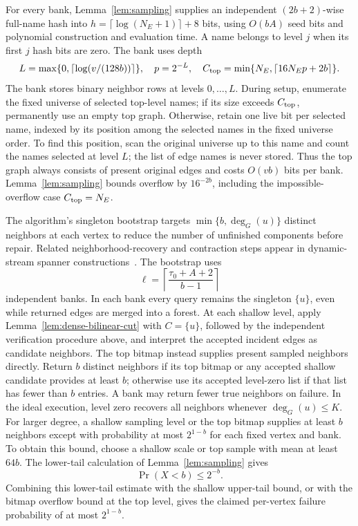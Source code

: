 \documentclass[11pt,letterpaper]{article}
\numberwithin{equation}{section}
\begin{document}
For every bank, Lemma~\ref{lem:sampling} supplies an independent $(2b+2)$-wise full-name hash into $h=\lceil\log(N_E+1)\rceil+8$ bits, using $O(bA)$ seed bits and polynomial construction and evaluation time.
A name belongs to level $j$ when its first $j$ hash bits are zero.
The bank uses depth
\begin{equation}
L=\max\{0,\lceil\log(v/(128b))\rceil\},\quad
 p=2^{-L},\quad
 C_{\rm top}=\min\{N_E,\lceil16N_Ep+2b\rceil\}.
                                                               \label{eq:forest-df13}
\end{equation}
The bank stores binary neighbor rows at levels $0,\ldots,L$.
During setup, enumerate the fixed universe of selected top-level names; if its size exceeds $C_{\rm top}$, permanently use an empty top graph.
Otherwise, retain one live bit per selected name, indexed by its position among the selected names in the fixed universe order.
To find this position, scan the original universe up to this name and count the names selected at level $L$; the list of edge names is never stored.
Thus the top graph always consists of present original edges and costs $O(vb)$ bits per bank.
Lemma~\ref{lem:sampling} bounds overflow by $16^{-2b}$, including the impossible-overflow case $C_{\rm top}=N_E$.

The algorithm's singleton bootstrap targets $\min\{b,\deg_G(u)\}$ distinct neighbors at each vertex to reduce the number of unfinished components before repair.
Related neighborhood-recovery and contraction steps appear in dynamic-stream spanner constructions~\cite{KapralovWoodruff2014}.
The bootstrap uses
\begin{equation}
\ell=\left\lceil\frac{\tau_0+A+2}{b-1}\right\rceil
                                                               \label{eq:forest-df14}
\end{equation}
independent banks.
In each bank every query remains the singleton $\{u\}$, even while returned edges are merged into a forest.
At each shallow level, apply Lemma~\ref{lem:dense-bilinear-cut} with $C=\{u\}$, followed by the independent verification procedure above, and interpret the accepted incident edges as candidate neighbors.
The top bitmap instead supplies present sampled neighbors directly.
Return $b$ distinct neighbors if its top bitmap or any accepted shallow candidate provides at least $b$; otherwise use its accepted level-zero list if that list has fewer than $b$ entries.
A bank may return fewer true neighbors on failure.
In the ideal execution, level zero recovers all neighbors whenever $\deg_G(u)\le K$.
For larger degree, a shallow sampling level or the top bitmap supplies at least $b$ neighbors except with probability at most $2^{1-b}$ for each fixed vertex and bank.
To obtain this bound, choose a shallow scale or top sample with mean at least $64b$.
The lower-tail calculation of Lemma~\ref{lem:sampling} gives
\begin{equation}
\Pr(X<b)\le2^{-b}.
                                                               \label{eq:forest-df15}
\end{equation}
Combining this lower-tail estimate with the shallow upper-tail bound, or with the bitmap overflow bound at the top level, gives the claimed per-vertex failure probability of at most $2^{1-b}$.
\end{document}
